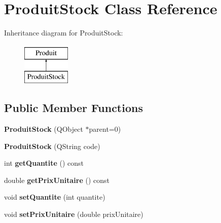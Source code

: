 \hypertarget{class_produit_stock}{
\section{ProduitStock Class Reference}
\label{class_produit_stock}
}
Inheritance diagram for ProduitStock:\begin{figure}[H]
\begin{center}
\leavevmode
\includegraphics[height=2.000000cm]{class_produit_stock}
\end{center}
\end{figure}
\subsection*{Public Member Functions}
\begin{DoxyCompactItemize}
\item 
\hypertarget{class_produit_stock_a689ab067e746885fe8c74b1065bdae60}{
{\bfseries ProduitStock} (QObject $\ast$parent=0)}
\label{class_produit_stock_a689ab067e746885fe8c74b1065bdae60}

\item 
\hypertarget{class_produit_stock_ad535acc13f22959829fdb1221f9d74cc}{
{\bfseries ProduitStock} (QString code)}
\label{class_produit_stock_ad535acc13f22959829fdb1221f9d74cc}

\item 
\hypertarget{class_produit_stock_a8c4fa4f9f829e4212060bdbcf555e7b6}{
int {\bfseries getQuantite} () const }
\label{class_produit_stock_a8c4fa4f9f829e4212060bdbcf555e7b6}

\item 
\hypertarget{class_produit_stock_a6a6a3d513511860e63b75b1c333dfbaf}{
double {\bfseries getPrixUnitaire} () const }
\label{class_produit_stock_a6a6a3d513511860e63b75b1c333dfbaf}

\item 
\hypertarget{class_produit_stock_af61f23add04996fb5ece3ca52c90b10b}{
void {\bfseries setQuantite} (int quantite)}
\label{class_produit_stock_af61f23add04996fb5ece3ca52c90b10b}

\item 
\hypertarget{class_produit_stock_a6f25bef16f4f410bef0ea677afd1ea75}{
void {\bfseries setPrixUnitaire} (double prixUnitaire)}
\label{class_produit_stock_a6f25bef16f4f410bef0ea677afd1ea75}

\end{DoxyCompactItemize}
